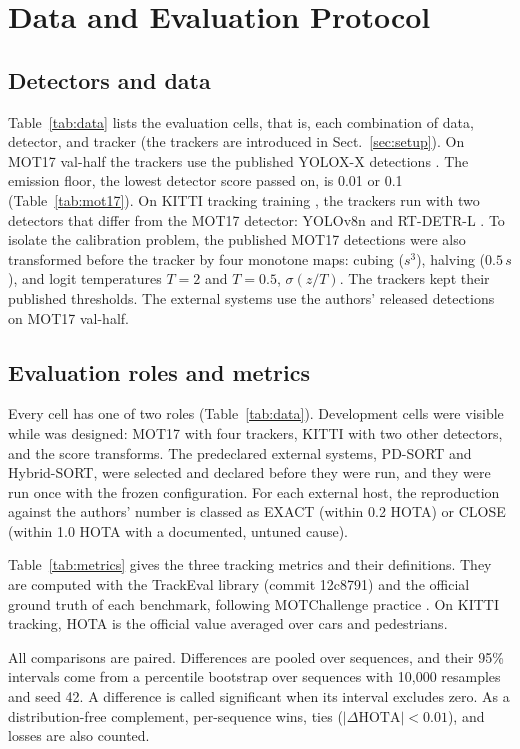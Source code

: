 \section{Data and Evaluation Protocol}\label{sec:data-eval}

\subsection{Detectors and data}\label{sec:data}
Table~\ref{tab:data} lists the evaluation cells, that is, each combination of
data, detector, and tracker (the trackers are introduced in Sect.~\ref{sec:setup}). On MOT17 val-half
\cite{milan2016mot16} the trackers use the published YOLOX-X detections
\cite{ge2021yolox}. The emission floor, the lowest detector score passed on,
is 0.01 or 0.1 (Table~\ref{tab:mot17}). On KITTI tracking training \cite{geiger2012kitti}, the trackers run
with two detectors that differ from the MOT17 detector: YOLOv8n
\cite{jocher2023yolov8} and RT-DETR-L \cite{zhao2024rtdetr}. To isolate the
calibration problem, the published MOT17 detections were also transformed
before the tracker by four monotone maps: cubing ($s^3$), halving ($0.5\,s$),
and logit temperatures $T=2$ and $T=0.5$, $\sigma(z/T)$. The trackers kept
their published thresholds. The external systems use the authors' released
detections on MOT17 val-half.



\subsection{Evaluation roles and metrics}\label{sec:roles}
Every cell has one of two roles (Table~\ref{tab:data}). Development cells
were visible while \scl{} was designed: MOT17 with four trackers, KITTI
with two other detectors, and the score transforms. The predeclared external
systems, PD-SORT and Hybrid-SORT, were selected and declared before they were
run, and they were run once with the frozen configuration. For each external
host, the reproduction against the authors' number is classed as EXACT
(within 0.2 HOTA) or CLOSE (within 1.0 HOTA with a documented, untuned
cause).

\label{sec:metrics}Table~\ref{tab:metrics} gives the three tracking metrics
and their definitions. They are computed with the TrackEval library (commit
12c8791) and the official ground truth of each benchmark, following
MOTChallenge practice \cite{dendorfer2021motchallenge}. On KITTI tracking,
HOTA is the official value averaged over cars and pedestrians.



All comparisons are paired. Differences are pooled over sequences, and their
95\% intervals come from a percentile bootstrap over sequences
\cite{efron1993bootstrap} with 10,000 resamples and seed 42. A difference is
called significant when its interval excludes zero. As a distribution-free
complement, per-sequence wins, ties ($|\Delta\mathrm{HOTA}|<0.01$), and losses
are also counted.
